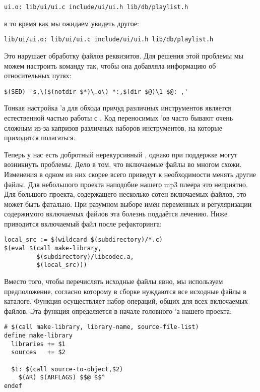 {\footnotesize
\begin{verbatim}
ui.o: lib/ui/ui.c include/ui/ui.h lib/db/playlist.h
\end{verbatim}
}

в то время как мы ожидаем увидеть другое:


{\footnotesize
\begin{verbatim}
lib/ui/ui.o: lib/ui/ui.c include/ui/ui.h lib/db/playlist.h
\end{verbatim}
}

Это нарушает обработку файлов реквизитов. Для решения этой проблемы мы
можем настроить команду  так, чтобы она добавляла
информацию об относительных путях:

{\footnotesize
\begin{verbatim}
$(SED) 's,\($(notdir $*)\.o\) *:,$(dir $@)\1 $@: ,'
\end{verbatim}
}

Тонкая настройка \Makefile{}'а для обхода причуд различных
инструментов является естественной частью работы с \GNUmake{}.
Код переносимых \Makefile{}'ов часто бывают очень сложным из-за
капризов различных наборов инструментов, на которые приходится
полагаться.

Теперь у нас есть добротный нерекурсивный \Makefile{}, однако при
поддержке могут возникнуть проблемы. Дело в том, что включаемые файлы
 во многом схожи. Изменения в одном из них скорее
всего приведут к необходимости менять другие файлы. Для небольшого
проекта наподобие нашего mp3 плеера это неприятно. Для большого
проекта, содержащего несколько сотен включаемых файлов, это может быть
фатально. При разумном выборе имён переменных и регуляризации
содержимого включаемых файлов эта болезнь поддаётся лечению. Ниже
приводится включаемый файл  после рефакторинга:

{\footnotesize
\begin{verbatim}
local_src := $(wildcard $(subdirectory)/*.c)
$(eval $(call make-library,
         $(subdirectory)/libcodec.a,
		 $(local_src)))
\end{verbatim}
}

Вместо того, чтобы перечислять исходные файлы явно, мы используем
предположение, согласно которому в сборке нуждаются все исходные файлы
в каталоге. Функция  осуществляет набор
операций, общих для всех включаемых файлов. Эта функция определяется в
начале головного \Makefile{}'а нашего проекта:

{\footnotesize
\begin{verbatim}
# $(call make-library, library-name, source-file-list)
define make-library
  libraries += $1
  sources   += $2

  $1: $(call source-to-object,$2)
    $(AR) $(ARFLAGS) $$@ $$^
endef
\end{verbatim}
}

